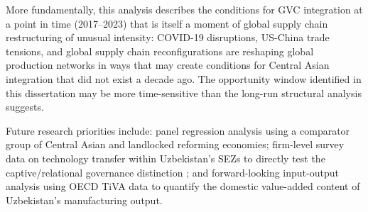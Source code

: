 More fundamentally, this analysis describes the conditions for GVC integration at a point in time (2017--2023) that is itself a moment of global supply chain restructuring of unusual intensity: COVID-19 disruptions, US-China trade tensions, and global supply chain reconfigurations are reshaping global production networks in ways that may create conditions for Central Asian integration that did not exist a decade ago. The opportunity window identified in this dissertation may be more time-sensitive than the long-run structural analysis suggests.

Future research priorities include: panel regression analysis using a comparator group of Central Asian and landlocked reforming economies; firm-level survey data on technology transfer within Uzbekistan's SEZs to directly test the captive/relational governance distinction \citep{gereffi2005}; and forward-looking input-output analysis using OECD TiVA data to quantify the domestic value-added content of Uzbekistan's manufacturing output.
